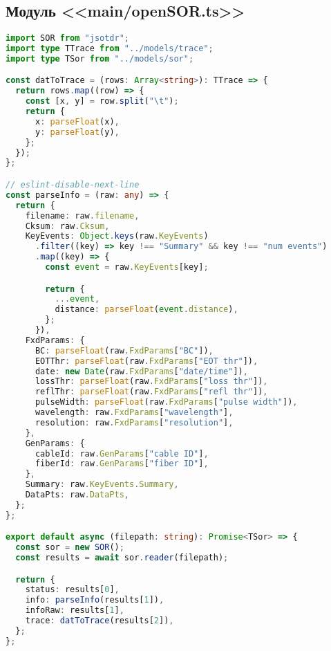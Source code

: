 \subsection{Модуль <<main/openSOR.ts>>}
\begin{lstlisting}[language=typescript]
import SOR from "jsotdr";
import type TTrace from "../models/trace";
import type TSor from "../models/sor";

const datToTrace = (rows: Array<string>): TTrace => {
  return rows.map((row) => {
    const [x, y] = row.split("\t");
    return {
      x: parseFloat(x),
      y: parseFloat(y),
    };
  });
};

// eslint-disable-next-line
const parseInfo = (raw: any) => {
  return {
    filename: raw.filename,
    Cksum: raw.Cksum,
    KeyEvents: Object.keys(raw.KeyEvents)
      .filter((key) => key !== "Summary" && key !== "num events")
      .map((key) => {
        const event = raw.KeyEvents[key];

        return {
          ...event,
          distance: parseFloat(event.distance),
        };
      }),
    FxdParams: {
      BC: parseFloat(raw.FxdParams["BC"]),
      EOTThr: parseFloat(raw.FxdParams["EOT thr"]),
      date: new Date(raw.FxdParams["date/time"]),
      lossThr: parseFloat(raw.FxdParams["loss thr"]),
      reflThr: parseFloat(raw.FxdParams["refl thr"]),
      pulseWidth: parseFloat(raw.FxdParams["pulse width"]),
      wavelength: raw.FxdParams["wavelength"],
      resolution: raw.FxdParams["resolution"],
    },
    GenParams: {
      cableId: raw.GenParams["cable ID"],
      fiberId: raw.GenParams["fiber ID"],
    },
    Summary: raw.KeyEvents.Summary,
    DataPts: raw.DataPts,
  };
};

export default async (filepath: string): Promise<TSor> => {
  const sor = new SOR();
  const results = await sor.reader(filepath);

  return {
    status: results[0],
    info: parseInfo(results[1]),
    infoRaw: results[1],
    trace: datToTrace(results[2]),
  };
};  
\end{lstlisting}
